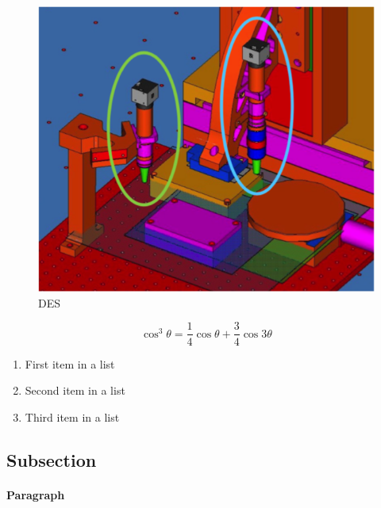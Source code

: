 \documentclass[fleqn,10pt]{SelfArx} %
\begin{document}
\begin{figure}[ht]\centering %
\includegraphics[width=\linewidth]{CADSetup.png}
\caption{DES}
\label{fig:cadsetup}
\end{figure}


\lipsum[4] %

\begin{equation}
\cos^3 \theta =\frac{1}{4}\cos\theta+\frac{3}{4}\cos 3\theta
\label{eq:refname2}
\end{equation}

\lipsum[5] %

\begin{enumerate}[noitemsep] %
\item First item in a list
\item Second item in a list
\item Third item in a list
\end{enumerate}

\subsection{Subsection}

\lipsum[6] %

\paragraph{Paragraph} \lipsum[7] %
\end{document}
